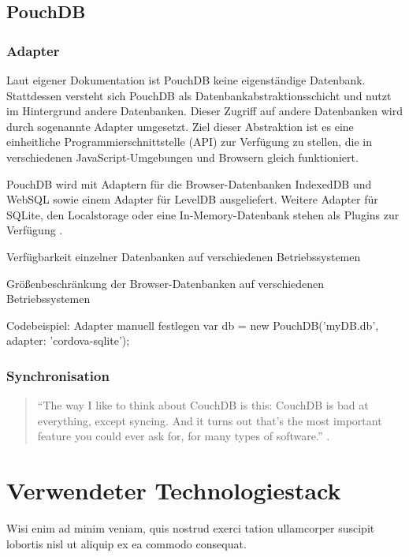 \section{PouchDB}
\label{PouchDB}

\subsection{Adapter}
\label{Adapter}

Laut eigener Dokumentation ist PouchDB keine eigenständige Datenbank. Stattdessen versteht sich PouchDB als Datenbankabstraktionsschicht und nutzt im Hintergrund andere Datenbanken. Dieser Zugriff auf andere Datenbanken wird durch sogenannte Adapter umgesetzt. Ziel dieser Abstraktion ist es eine einheitliche Programmierschnittstelle (API) zur Verfügung zu stellen, die in verschiedenen JavaScript-Umgebungen und Browsern gleich funktioniert.

PouchDB wird mit Adaptern für die Browser-Datenbanken IndexedDB und WebSQL sowie einem Adapter für LevelDB ausgeliefert. Weitere Adapter für SQLite, den Localstorage oder eine In-Memory-Datenbank stehen als Plugins zur Verfügung \cite{pouch:adapters}.

Verfügbarkeit einzelner Datenbanken auf verschiedenen Betriebssystemen

Größenbeschränkung der Browser-Datenbanken auf verschiedenen Betriebssystemen

Codebeispiel: Adapter manuell festlegen
var db = new PouchDB('myDB.db', {adapter: 'cordova-sqlite'});


\subsection{Synchronisation}
\label{Synchronisation}

\begin{citeenv}
	\begin{quotation}
		"`The way I like to think about CouchDB is this: CouchDB is bad at everything, except syncing. And it turns out that's the most important feature you could ever ask for, for many types of software."' \cite{pouch:replication}.
	\end{quotation}
\end{citeenv}


\chapter{Verwendeter Technologiestack}
\label{chap:Technologien}
Wisi enim ad minim veniam, quis nostrud exerci tation ullamcorper suscipit lobortis nisl ut aliquip ex ea commodo consequat.

